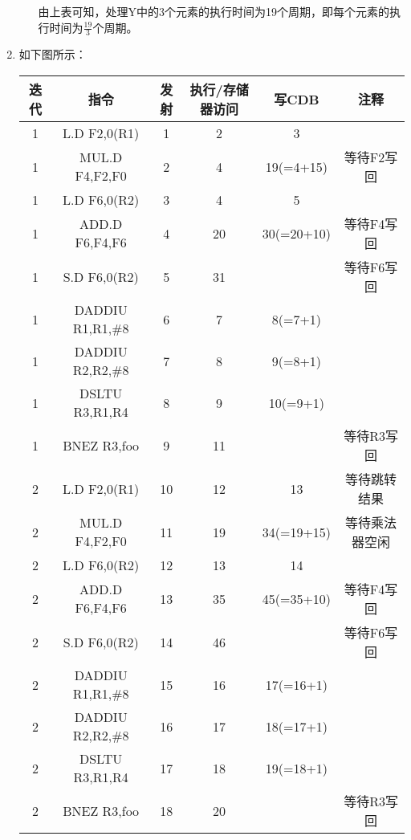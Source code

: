 \documentclass{article}
\begin{document}
\begin{enumerate}[label=\arabic*.]
\begin{enumerate}[label=\alph*.]
\begin{table}[H]
\begin{tabular}{cc}
                \end{tabular}
            \end{table}
            由上表可知，处理Y中的3个元素的执行时间为19个周期，即每个元素的执行时间为$\frac{19}{3}$个周期。
        \end{enumerate}
        \item 如下图所示：\\
        \begin{table}[H]
            \centering
            \begin{tabular}{cccccc}
                \hline
                迭代 & 指令 & 发射 & 执行/存储器访问 & 写CDB & 注释\\
                \hline
                1 & L.D F2,0(R1) & 1 & 2 & 3 & ~ \\
                1 & MUL.D F4,F2,F0 & 2 & 4 & 19(=4+15) & 等待F2写回 \\
                1 & L.D F6,0(R2) & 3 & 4 & 5 & ~ \\
                1 & ADD.D F6,F4,F6 & 4 & 20 & 30(=20+10) & 等待F4写回 \\
                1 & S.D F6,0(R2) & 5 & 31 & ~ & 等待F6写回 \\
                1 & DADDIU R1,R1,\#8 & 6 & 7 & 8(=7+1) & ~ \\
                1 & DADDIU R2,R2,\#8 & 7 & 8 & 9(=8+1) & ~ \\
                1 & DSLTU R3,R1,R4 & 8 & 9 & 10(=9+1) & ~ \\
                1 & BNEZ R3,foo & 9 & 11 & ~ & 等待R3写回 \\
                
                2 & L.D F2,0(R1) & 10 & 12 & 13 & 等待跳转结果 \\
                2 & MUL.D F4,F2,F0 & 11 & 19 & 34(=19+15) & 等待乘法器空闲 \\
                2 & L.D F6,0(R2) & 12 & 13 & 14 & ~ \\
                2 & ADD.D F6,F4,F6 & 13 & 35 & 45(=35+10) & 等待F4写回 \\
                2 & S.D F6,0(R2) & 14 & 46 & ~ & 等待F6写回 \\
                2 & DADDIU R1,R1,\#8 & 15 & 16 & 17(=16+1) & ~ \\
                2 & DADDIU R2,R2,\#8 & 16 & 17 & 18(=17+1) & ~ \\
                2 & DSLTU R3,R1,R4 & 17 & 18 & 19(=18+1) & ~ \\
                2 & BNEZ R3,foo & 18 & 20 & ~ & 等待R3写回 \\
                

\end{tabular}
\end{table}
\end{enumerate}
\end{document}
